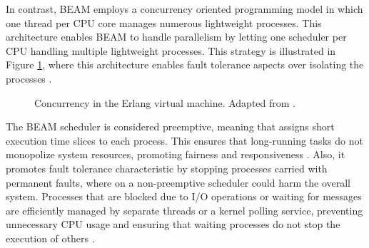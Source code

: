 In contrast, \gls{BEAM} employs a concurrency oriented programming model in which one thread per \gls{CPU} core manages numerous lightweight processes. This architecture enables \gls{BEAM} to handle parallelism by letting one scheduler per \gls{CPU} handling multiple lightweight processes. This strategy is illustrated in Figure \ref{fig:beam-process}, where this architecture enables fault tolerance aspects over isolating the processes \cite{Juric2024}.

\begin{figure}
    \centering
    \caption[Concurrency in the Erlang virtual machine]{Concurrency in the Erlang virtual machine. Adapted from \cite{Juric2024}.}
    \label{fig:beam-process}
\end{figure}

The \gls{BEAM} scheduler is considered preemptive, meaning that assigns short execution time slices to each process. This ensures that long-running tasks do not monopolize system resources, promoting fairness and responsiveness \cite{Armstrong2013}. Also, it promotes fault tolerance characteristic by stopping processes carried with permanent faults, where on a non-preemptive scheduler could harm the overall system. Processes that are blocked due to I/O operations or waiting for messages are efficiently managed by separate threads or a kernel polling service, preventing unnecessary CPU usage and ensuring that waiting processes do not stop the execution of others \cite{Juric2024,erlang-concurrency-blog}.


